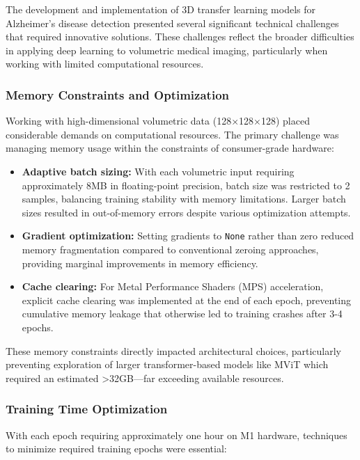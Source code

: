 \documentclass[12pt, a4paper]{article}
\begin{document}
The development and implementation of 3D transfer learning models for Alzheimer's disease detection presented several significant technical challenges that required innovative solutions. These challenges reflect the broader difficulties in applying deep learning to volumetric medical imaging, particularly when working with limited computational resources.

\subsubsection{Memory Constraints and Optimization}

Working with high-dimensional volumetric data (128×128×128) placed considerable demands on computational resources. The primary challenge was managing memory usage within the constraints of consumer-grade hardware:

\begin{itemize}
    \item \textbf{Adaptive batch sizing:} With each volumetric input requiring approximately 8MB in floating-point precision, batch size was restricted to 2 samples, balancing training stability with memory limitations. Larger batch sizes resulted in out-of-memory errors despite various optimization attempts.
    
    \item \textbf{Gradient optimization:} Setting gradients to \texttt{None} rather than zero reduced memory fragmentation compared to conventional zeroing approaches, providing marginal improvements in memory efficiency.
    
    \item \textbf{Cache clearing:} For Metal Performance Shaders (MPS) acceleration, explicit cache clearing was implemented at the end of each epoch, preventing cumulative memory leakage that otherwise led to training crashes after 3-4 epochs.
\end{itemize}

These memory constraints directly impacted architectural choices, particularly preventing exploration of larger transformer-based models like MViT which required an estimated >32GB—far exceeding available resources.

\subsubsection{Training Time Optimization}

With each epoch requiring approximately one hour on M1 hardware, techniques to minimize required training epochs were essential:
\end{document}
